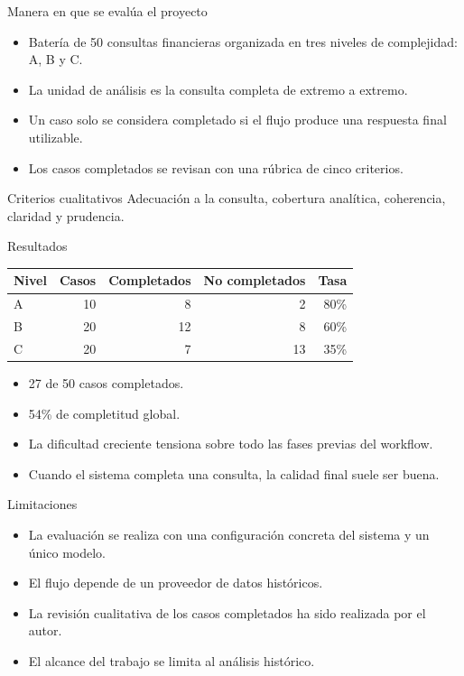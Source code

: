 \documentclass[aspectratio=169]{beamer}
\begin{document}
\begin{frame}{Manera en que se evalúa el proyecto}
\begin{itemize}
  \item Batería de 50 consultas financieras organizada en tres niveles de complejidad: A, B y C.
  \item La unidad de análisis es la consulta completa de extremo a extremo.
  \item Un caso solo se considera completado si el flujo produce una respuesta final utilizable.
  \item Los casos completados se revisan con una rúbrica de cinco criterios.
\end{itemize}

\vspace{0.2cm}

\begin{block}{Criterios cualitativos}
Adecuación a la consulta, cobertura analítica, coherencia, claridad y prudencia.
\end{block}
\end{frame}

\begin{frame}{Resultados}
\begin{table}
\centering
\small
\begin{tabular}{lrrrr}
\toprule
Nivel & Casos & Completados & No completados & Tasa \\
\midrule
A & 10 & 8 & 2 & 80\% \\
B & 20 & 12 & 8 & 60\% \\
C & 20 & 7 & 13 & 35\% \\
\bottomrule
\end{tabular}
\end{table}

\vspace{0.3cm}

\begin{itemize}
  \item 27 de 50 casos completados.
  \item 54\% de completitud global.
  \item La dificultad creciente tensiona sobre todo las fases previas del workflow.
  \item Cuando el sistema completa una consulta, la calidad final suele ser buena.
\end{itemize}
\end{frame}

\begin{frame}{Limitaciones}
\begin{itemize}
  \item La evaluación se realiza con una configuración concreta del sistema y un único modelo.
  \item El flujo depende de un proveedor de datos históricos.
  \item La revisión cualitativa de los casos completados ha sido realizada por el autor.
  \item El alcance del trabajo se limita al análisis histórico.
\end{itemize}
\end{frame}
\end{document}
